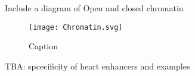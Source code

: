         \begin{center}
            Include a diagram of Open and closed chromatin
        \end{center}
        
        \begin{figure}
            \centering
            \texttt{[image: Chromatin.svg]}
            \caption{Caption}
            \label{fig:my_label}
        \end{figure}
        TBA: spcecificity of heart enhancers and examples

        


        
        
        
        
